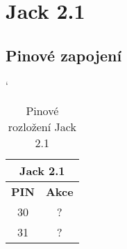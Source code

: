 
\section{Jack 2.1}

\subsection{Pinové zapojení}
\begin{table} [h!]
	\centering
	\catcode`
	\begin{tabular}[c]{|| c | c ||}
	\hline
		\multicolumn{2}{||c||}{Jack 2.1} \\
	\hline
 		 \textbf{PIN} & \textbf{Akce}\\
	\hline
		30 &  ?\\
	\hline
		31 & ? \\
	\hline
	\end{tabular}
	\caption{Pinové rozložení Jack 2.1}
	\label{table:pinJack21}
\end{table}